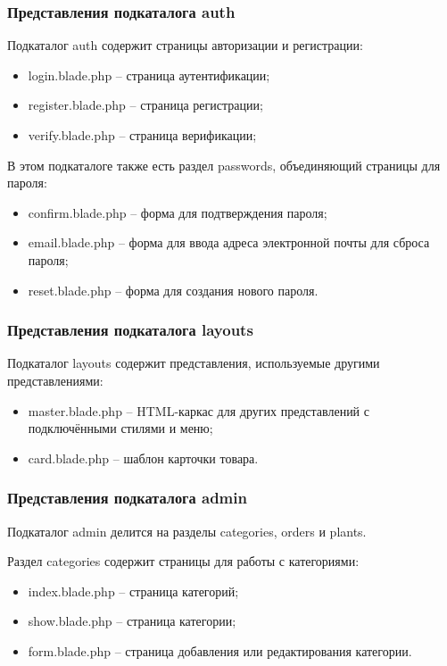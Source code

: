 \subsubsection{Представления подкаталога auth}
Подкаталог auth содержит страницы авторизации и регистрации:
\begin{itemize}
	\item login.blade.php – страница аутентификации;
	\item register.blade.php – страница регистрации;
	\item verify.blade.php – страница верификации;
\end{itemize}

В этом подкаталоге также есть раздел passwords, объединяющий страницы для пароля:
\begin{itemize}
	\item confirm.blade.php – форма для подтверждения пароля;
	\item email.blade.php – форма для ввода адреса электронной почты для сброса пароля;
	\item reset.blade.php – форма для создания нового пароля.
\end{itemize}

\subsubsection{Представления подкаталога layouts}
Подкаталог layouts содержит представления, используемые другими представлениями:
\begin{itemize}
	\item master.blade.php – HTML-каркас для других представлений с подключёнными стилями и меню;
	\item card.blade.php – шаблон карточки товара.
\end{itemize}

\subsubsection{Представления подкаталога admin}
Подкаталог admin делится на разделы categories, orders и plants. 

Раздел categories содержит страницы для работы с категориями:
\begin{itemize}
	\item index.blade.php – страница категорий;
	\item show.blade.php – страница категории;
	\item form.blade.php – страница добавления или редактирования категории.
\end{itemize}

